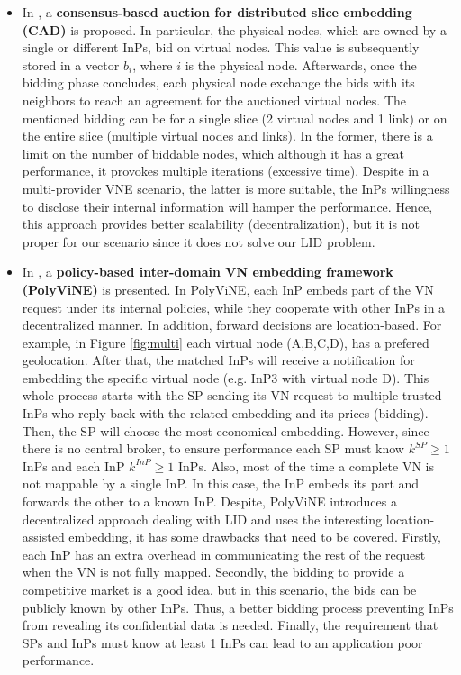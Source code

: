 \begin{itemize}
	\item In \citep{esposito2013general}, a \textbf{consensus-based auction for distributed slice embedding (CAD)} is proposed. In particular, the physical nodes, which are owned by a single or different InPs, bid on virtual nodes. This value is subsequently stored in a vector $b_i$, where $i$ is the physical node. Afterwards, once the bidding phase concludes, each physical node exchange the bids with its neighbors to reach an agreement for the auctioned virtual nodes. The mentioned bidding can be for a single slice (2 virtual nodes and 1 link) or on the entire slice (multiple virtual nodes and links). In the former, there is a limit on the number of biddable nodes, which although it has a great performance, it provokes multiple iterations (excessive time). Despite in a multi-provider VNE scenario, the latter is more suitable, the InPs willingness to disclose their internal information will hamper the performance. Hence, this approach provides better scalability (decentralization), but it is not proper for our scenario since it does not solve our LID problem.
	\item In \citep{chowdhury2010polyvine}, a \textbf{policy-based inter-domain VN embedding framework (PolyViNE)} is presented. In PolyViNE, each InP embeds part of the VN request under its internal policies, while they cooperate with other InPs in a decentralized manner. In addition, forward decisions are location-based. For example, in Figure \ref{fig:multi} each virtual node (A,B,C,D), has a prefered geolocation. After that, the matched InPs will receive a notification for embedding the specific virtual node (e.g. InP3 with virtual node D). This whole process starts with the SP sending its VN request to multiple trusted InPs who reply back with the related embedding and its prices (bidding). Then, the SP will choose the most economical embedding. However, since there is no central broker, to ensure performance each SP must know $k^{SP} \geq 1$ InPs and each InP $k^{InP} \geq 1$ InPs. Also, most of the time a complete VN is not mappable by a single InP. In this case, the InP embeds its part and forwards the other to a known InP. \newline
Despite, PolyViNE introduces a decentralized approach dealing with LID and uses the interesting location-assisted embedding, it has some drawbacks that need to be covered. Firstly, each InP has an extra overhead in communicating the rest of the request when the VN is not fully mapped. Secondly, the bidding to provide a competitive market is a good idea, but in this scenario, the bids can be publicly known by other InPs. Thus, a better bidding process preventing InPs from revealing its confidential data is needed. Finally, the requirement that SPs and InPs must know at least 1 InPs can lead to an application poor performance.
	

\end{itemize}
